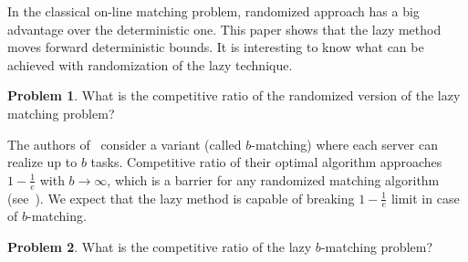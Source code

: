 \documentclass[12pt]{amsart}
\theoremstyle{definition}
\newtheorem{problem}{Problem}
\begin{document}
In the classical on-line matching problem, randomized approach has a big advantage over the deterministic one. 
This paper shows that the lazy method moves forward deterministic bounds. 
It is interesting to know what can be achieved with randomization of the lazy technique. 
\begin{problem}
 What is the competitive ratio of the randomized version of the lazy matching problem?
\end{problem}

The authors of~\cite{KalKir2000} consider a variant (called $b$-matching) where each server can realize up to $b$ tasks. 
Competitive ratio of their optimal algorithm approaches $1-\frac{1}{e}$ with $b\rightarrow \infty$, which is a barrier for any randomized matching algorithm (see~\cite{KVV90}). 
We expect that the lazy method  is capable of breaking $1-\frac{1}{e}$ limit in case of $b$-matching.
\begin{problem}
 What is the competitive ratio of the lazy $b$-matching problem?
\end{problem}


 
\end{document}
